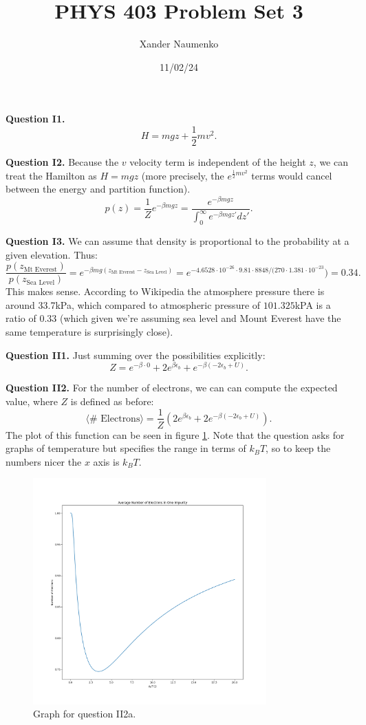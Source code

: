 \documentclass[letterpaper, reqno,11pt]{article}
\begin{document}
\title{PHYS 403 Problem Set 3}
\date{11/02/24}
\author{Xander Naumenko}
\maketitle

{\medskip\noindent\bf Question I1.} 
\[
H=mgz+\frac{1}{2}mv^2
.\]

{\medskip\noindent\bf Question I2.} Because the $v$ velocity term is independent of the height $z$, we can treat the Hamilton as $H=mgz$ (more precisely, the $e^{\frac{1}{2}mv^2}$ terms would cancel between the energy and partition function).
\[
p(z)= \frac{1}{Z}e^{-\beta mgz}= \frac{e^{-\beta mgz}}{\int_{0}^{\infty}e^{-\beta mgz'}dz'}
.\]

{\medskip\noindent\bf Question I3.} We can assume that density is proportional to the probability at a given elevation. Thus:
\[
\frac{p(z_{\text{Mt Everest}})}{p(z_{\text{Sea Level}})}=e^{-\beta mg(z_\text{Mt Everest}-z_\text{Sea Level})}=e^{-4.6528\cdot 10^{-26}\cdot 9.81\cdot 8848 /(270\cdot 1.381\cdot 10^{-23}}) = 0.34
.\]
This makes sense. According to Wikipedia the atmosphere pressure there is around 33.7kPa, which compared to atmospheric pressure of $101.325$kPA is a ratio of $0.33$ (which given we're assuming sea level and Mount Everest have the same temperature is surprisingly close).

{\medskip\noindent\bf Question II1.} Just summing over the possibilities explicitly:
\[
Z = e^{-\beta \cdot 0}+2e^{\beta \epsilon_b}+e^{-\beta(-2\epsilon_b+U)}
.\]

{\medskip\noindent\bf Question II2.} For the number of electrons, we can can compute the expected value, where $Z$ is defined as before:
\[
\langle \#\text{ Electrons} \rangle =\frac{1}{Z}\left( 2e^{\beta \epsilon_b}+2e^{-\beta(-2\epsilon_b+U)} \right) 
.\]
The plot of this function can be seen in figure \ref{fig:II2a}. Note that the question asks for graphs of temperature but specifies the range in terms of $k_BT$, so to keep the numbers nicer the $x$ axis is $k_BT$.

\begin{figure}[htpb]
    \centering
    \includegraphics[width=0.8\textwidth]{II2a}
    \caption{Graph for question II2a.}
    \label{fig:II2a}
\end{figure}
\end{document}
